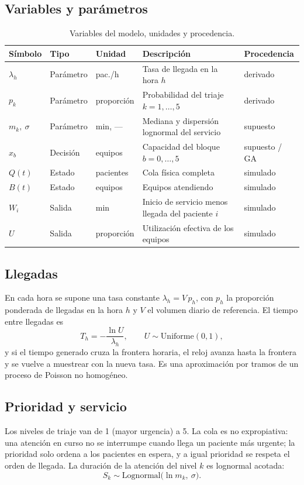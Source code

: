 \subsection{Variables y parámetros}
\begin{table}[ht]
\centering\small
\caption{Variables del modelo, unidades y procedencia.}
\label{tab:variables}
\begin{tabularx}{\linewidth}{@{}l l l X l@{}}
\toprule
Símbolo & Tipo & Unidad & Descripción & Procedencia \\
\midrule
$\lambda_h$ & Parámetro & pac./h & Tasa de llegada en la hora $h$ & derivado \\
$p_k$ & Parámetro & proporción & Probabilidad del triaje $k=1,\dots,5$ & derivado \\
$m_k,\ \sigma$ & Parámetro & min, --- & Mediana y dispersión lognormal del servicio & supuesto \\
$x_b$ & Decisión & equipos & Capacidad del bloque $b=0,\dots,5$ & supuesto / GA \\
$Q(t)$ & Estado & pacientes & Cola física completa & simulado \\
$B(t)$ & Estado & equipos & Equipos atendiendo & simulado \\
$W_i$ & Salida & min & Inicio de servicio menos llegada del paciente $i$ & simulado \\
$U$ & Salida & proporción & Utilización efectiva de los equipos & simulado \\
\bottomrule
\end{tabularx}
\end{table}

\subsection{Llegadas}
En cada hora se supone una tasa constante $\lambda_h=V\,p_h$, con $p_h$ la proporción
ponderada de llegadas en la hora $h$ y $V$ el volumen diario de referencia. El tiempo entre
llegadas es
\begin{equation}
T_h=-\frac{\ln U}{\lambda_h},\qquad U\sim\mathrm{Uniforme}(0,1),
\end{equation}
y si el tiempo generado cruza la frontera horaria, el reloj avanza hasta la frontera y se
vuelve a muestrear con la nueva tasa. Es una aproximación por tramos de un proceso de
Poisson no homogéneo.

\subsection{Prioridad y servicio}
Los niveles de triaje van de 1 (mayor urgencia) a 5. La cola es no expropiativa: una
atención en curso no se interrumpe cuando llega un paciente más urgente; la prioridad solo
ordena a los pacientes en espera, y a igual prioridad se respeta el orden de llegada. La
duración de la atención del nivel $k$ es lognormal acotada:
\begin{equation}
S_k\sim\mathrm{Lognormal}\bigl(\ln m_k,\ \sigma\bigr).
\end{equation}

